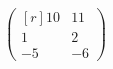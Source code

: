 \documentclass[a4paper]{article}
\begin{document}
\[
\begin{pmatrix*}[r]
  10&11\\
   1&2\\
  -5&-6
\end{pmatrix*}
\]
\end{document}
